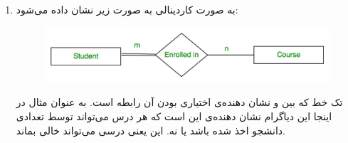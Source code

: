 \begin{enumerate}
    \item به صورت کاردینالی به صورت زیر نشان داده می‌شود:
    \begin{figure}[H]
        \centering \includegraphics[scale=0.4]{pics/nullable1.jpg}
    \end{figure}
    تک خط که بین
     و 
    نشان دهنده‌ی اختیاری بودن آن رابطه است. به عنوان مثال در اینجا این دیاگرام نشان دهنده‌ی این است
    که هر درس می‌تواند توسط تعدادی دانشجو اخذ شده باشد یا نه. این یعنی درسی می‌تواند خالی بماند.


\end{enumerate}
